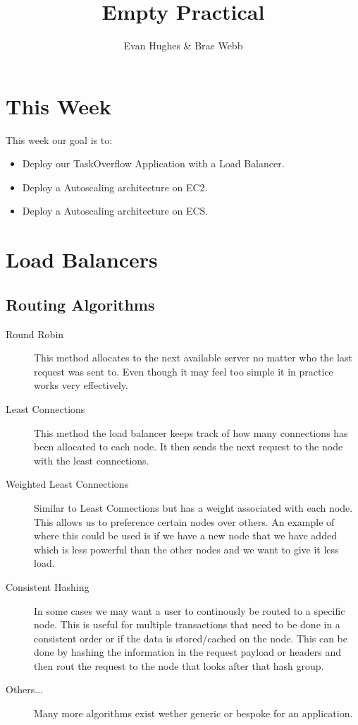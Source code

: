 \documentclass{csse4400}
\title{Empty Practical}
\author{Evan Hughes \& Brae Webb}
\date{\week{0}}
\begin{document}
\maketitle

\section{This Week}
This week our goal is to:
\begin{itemize}
  \item Deploy our TaskOverflow Application with a Load Balancer.
  \item Deploy a Autoscaling architecture on EC2.
  \item Deploy a Autoscaling architecture on ECS. 
\end{itemize}

\section{Load Balancers}


\subsection{Routing Algorithms}

\begin{description}
  \item[Round Robin] This method allocates to the next available server no matter who the last request was sent to. Even though it may feel too simple it in practice works very effectively.
  \item[Least Connections] This method the load balancer keeps track of how many connections has been allocated to each node. It then sends the next request to the node with the least connections.
  \item[Weighted Least Connections] Similar to Least Connections but has a weight associated with each node. This allows us to preference certain nodes over others. An example of where this could be used is if we have a new node that we have added which is less powerful than the other nodes and we want to give it less load.
  \item[Consistent Hashing] In some cases we may want a user to continously be routed to a specific node. This is useful for multiple transactions that need to be done in a consistent order or if the data is stored/cached on the node. This can be done by hashing the information in the request payload or headers and then rout the request to the node that looks after that hash group.
  \item[Others...] Many more algorithms exist wether generic or bespoke for an application. 
\end{description}
\end{document}
